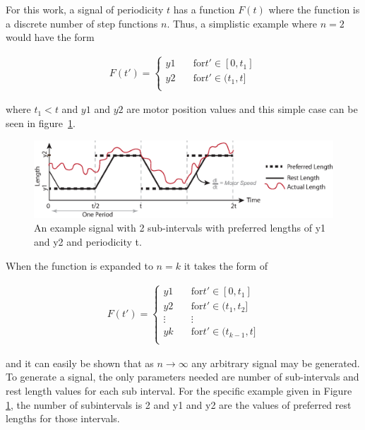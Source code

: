 For this work, a signal of periodicity \(t\) has a function \(F(t)\) where the function is a discrete number of step functions \(n\).
Thus, a simplistic example where \(n = 2\) would have the form

\begin{align}
F(t') =
  \begin{cases}
    y1       & \quad \text{for} t' \in [0, t_{1}]\\
    y2       & \quad \text{for} t' \in (t_{1}, t]\\
  \end{cases}
\end{align}

where \(t_{1} < t\) and \(y1\) and \(y2\) are motor position values and this simple case can be seen in figure~\ref{fig:signal}.

\begin{figure}[t]
\centering
\includegraphics[width=\columnwidth]{tex/ASME-journal/fig/signal.eps}
\caption{An example signal with 2 sub-intervals with preferred lengths of y1 and y2 and periodicity t.}
\label{fig:signal}
\end{figure}

When the function is expanded to \(n = k\) it takes the form of

\begin{align}
F(t') =
  \begin{cases}
    y1       & \quad \text{for} t' \in [0, t_{1}]\\
    y2       & \quad \text{for} t' \in (t_{1}, t_{2}]\\
    \vdots   & \quad \vdots \\
    yk       & \quad \text{for} t' \in (t_{k-1}, t]\\
  \end{cases}
\end{align}

and it can easily be shown that as \(n \to \infty\) any arbitrary signal may be generated.
To generate a signal, the only parameters needed are number of sub-intervals and rest length values for each sub interval. 
For the specific example given in Figure \ref{fig:signal}, the number of subintervals is 2 and y1 and y2 are the values of preferred rest lengths for those intervals. 

